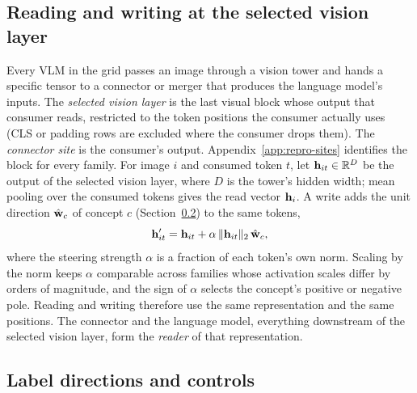 \documentclass[11pt]{article}
\begin{document}
\subsection{Reading and writing at the selected vision layer}
\label{sec:site}

Every VLM in the grid passes an image through a vision tower and hands a specific tensor to a connector or merger that produces the language model's inputs. The \emph{selected vision layer} is the last visual block whose output that consumer reads, restricted to the token positions the consumer actually uses (CLS or padding rows are excluded where the consumer drops them). The \emph{connector site} is the consumer's output. Appendix~\ref{app:repro-sites} identifies the block for every family. For image $i$ and consumed token $t$, let $\mathbf{h}_{it}\in\mathbb{R}^D$ be the output of the selected vision layer, where $D$ is the tower's hidden width; mean pooling over the consumed tokens gives the read vector $\mathbf{h}_i$. A write adds the unit direction $\hat{\mathbf{w}}_c$ of concept $c$ (Section~\ref{sec:directions}) to the same tokens,
\begin{equation}
\mathbf{h}'_{it}=\mathbf{h}_{it}+\alpha\,\lVert\mathbf{h}_{it}\rVert_2\,\hat{\mathbf{w}}_c,
\label{eq:intervention}
\end{equation}
where the steering strength $\alpha$ is a fraction of each token's own norm. Scaling by the norm keeps $\alpha$ comparable across families whose activation scales differ by orders of magnitude, and the sign of $\alpha$ selects the concept's positive or negative pole. Reading and writing therefore use the same representation and the same positions. The connector and the language model, everything downstream of the selected vision layer, form the \emph{reader} of that representation.

\subsection{Label directions and controls}
\label{sec:directions}
\end{document}
